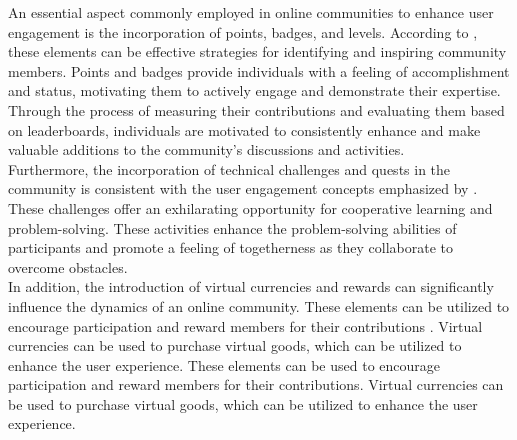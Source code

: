 An essential aspect commonly employed in online communities to enhance user engagement is the incorporation of points, badges, and levels. According to \textcite{mauroner19}, these elements can be effective strategies for identifying and inspiring community members. Points and badges provide individuals with a feeling of accomplishment and status, motivating them to actively engage and demonstrate their expertise. Through the process of measuring their contributions and evaluating them based on leaderboards, individuals are motivated to consistently enhance and make valuable additions to the community's discussions and activities. \\

Furthermore, the incorporation of technical challenges and quests in the community is consistent with the user engagement concepts emphasized by \textcite{hsu18}. These challenges offer an exhilarating opportunity for cooperative learning and problem-solving. These activities enhance the problem-solving abilities of participants and promote a feeling of togetherness as they collaborate to overcome obstacles. \\

In addition, the introduction of virtual currencies and rewards can significantly influence the dynamics of an online community. These elements can be utilized to encourage participation and reward members for their contributions \parencite{mauroner19}. Virtual currencies can be used to purchase virtual goods, which can be utilized to enhance the user experience. These elements can be used to encourage participation and reward members for their contributions. Virtual currencies can be used to purchase virtual goods, which can be utilized to enhance the user experience. \\

